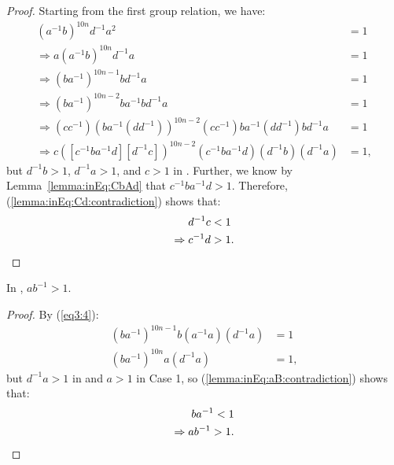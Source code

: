 \begin{proof} Starting from the first group relation, we have:
\begin{align}
(a^{-1}b)^{10n}d^{-1}a^{2}&=1\nonumber{}\\
\Rightarrow{}a(a^{-1}b)^{10n}d^{-1}a&=1\nonumber{}\\
\Rightarrow{}(ba^{-1})^{10n-1}bd^{-1}a&=1\label{eq3:4}\\
\Rightarrow{}(ba^{-1})^{10n-2}ba^{-1}bd^{-1}a&=1\nonumber{}\\
\Rightarrow{}(cc^{-1})(ba^{-1}(dd^{-1}))^{10n-2}(cc^{-1})ba^{-1}(dd^{-1})bd^{-1}a&=1\nonumber{}\\
\Rightarrow{}c([c^{-1}ba^{-1}d][d^{-1}c])^{10n-2}(c^{-1}ba^{-1}d)(d^{-1}b)(d^{-1}a)&=1,\label{lemma:inEq:Cd:contradiction}
\end{align}
but $d^{-1}b>1$, $d^{-1}a>1$, and $c>1$ in . Further, we know by Lemma~\ref{lemma:inEq:CbAd} that $c^{-1}ba^{-1}d>1$. Therefore, (\ref{lemma:inEq:Cd:contradiction}) shows that:
\begin{align*}
d^{-1}c&<1\\
\Rightarrow{}c^{-1}d&>1.\qedhere
\end{align*}
\end{proof}

\begin{lemma} In , $ab^{-1} > 1$.
\label{lemma:inEq:aB}
\end{lemma}

\begin{proof} By (\ref{eq3:4}):
\begin{align}
(ba^{-1})^{10n-1}b(a^{-1}a)(d^{-1}a)&=1\nonumber{}\\
(ba^{-1})^{10n}a(d^{-1}a)&=1,\label{lemma:inEq:aB:contradiction}
\end{align}
but $d^{-1}a>1$ in  and $a>1$ in Case 1, so (\ref{lemma:inEq:aB:contradiction}) shows that:
\begin{align*}
ba^{-1}<1\\
\Rightarrow{}ab^{-1}>1.\qedhere
\end{align*}
\end{proof}

